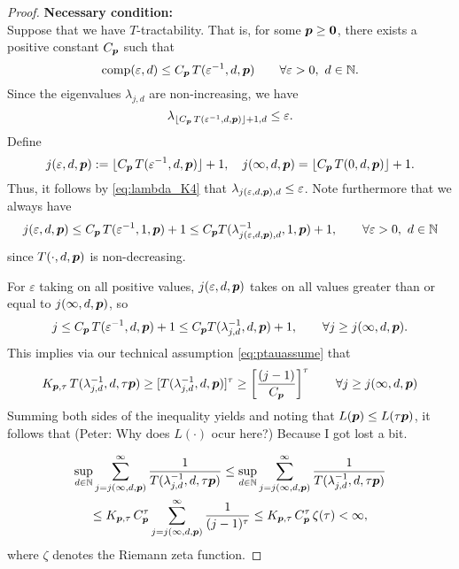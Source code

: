 \documentclass[11pt,a4paper]{article}
\newcommand{\fred}[1]{\begingroup\color{blue}#1\endgroup}
\newcommand{\peter}[1]{\begingroup\color{purple}#1\endgroup}
\begin{document}
\begin{proof}
\noindent \textbf{Necessary condition:}\\
Suppose that we have
$T$-tractability. That is, for some $\boldsymbol{p} \ge \boldsymbol{0}$, there exists a positive constant $C_{\boldsymbol{p}}$ such that
\[
\operatorname{comp}(\varepsilon,d)\le C_{\boldsymbol{p}}\, T(\varepsilon^{-1},d,\boldsymbol{p}) \qquad \forall \varepsilon > 0,  \ d \in \mathbb{N}.
\]
Since the eigenvalues $\lambda_{j,d}$ are non-increasing, we have
\begin{equation}\label{eq:lambda_K4}
	\lambda_{\lfloor C_{\boldsymbol{p}}\, T(\varepsilon^{-1},d,\boldsymbol{p})\rfloor +1,d}\le \varepsilon.
\end{equation}
Define
\[
j (\varepsilon,d,\boldsymbol{p}):= \lfloor C_{\boldsymbol{p}}\, T(\varepsilon^{-1},d,\boldsymbol{p})\rfloor +1, \quad
j (\infty,d,\boldsymbol{p}) = \lfloor C_{\boldsymbol{p}}\, T(0,d,\boldsymbol{p})\rfloor +1.
\]
Thus, it follows by \eqref{eq:lambda_K4} that $\lambda_{j(\varepsilon,d,\boldsymbol{p}),d} \le \varepsilon$.
Note furthermore that we always have
\[
j(\varepsilon,d,\boldsymbol{p})\le C_{\boldsymbol{p}}\, T(\varepsilon^{-1},1,\boldsymbol{p})+1 \le C_{\boldsymbol{p}} T(\lambda_{j(\varepsilon,d,\boldsymbol{p}),d}^{-1},1,\boldsymbol{p})+1, \qquad \forall \varepsilon > 0, \ d \in \mathbb{N}
\]
since
$T(\cdot,d,\boldsymbol{p})$ is non-decreasing.

For $\varepsilon$ taking on all positive values, $j(\varepsilon,d,\boldsymbol{p})$ takes on all values greater than or equal to $j(\infty,d,\boldsymbol{p})$, so
\[
j\le C_{\boldsymbol{p}}\, T(\varepsilon^{-1},d,\boldsymbol{p})+1 \le C_{\boldsymbol{p}} T(\lambda_{j,d}^{-1},d,\boldsymbol{p})+1, \qquad \forall j \ge j(\infty,d,\boldsymbol{p}).
\]
This implies via our technical assumption \eqref{eq:ptauassume} that
\begin{equation*}
	K_{\boldsymbol{p},\tau}\,T (\lambda_{j,d}^{-1},d,\tau \boldsymbol{p}) \ge
	[T(\lambda_{j,d}^{-1},d, \boldsymbol{p})]^\tau
	\ge
	\left[\frac{(j-1)}{C_{\boldsymbol{p}}}\right]^\tau \qquad \forall j \ge j(\infty,d,\boldsymbol{p})
\end{equation*}
Summing both sides of the inequality yields and noting that $L(\boldsymbol{p}) \le L(\tau\boldsymbol{p})$, it follows that
\peter{(Peter: Why does $L(\cdot)$ ocur here?)} \fred{Because I got lost a bit.}

\begin{multline*}
	\sup_{d\in\mathbb{N}} \sum_{j=j(\infty,d,\boldsymbol{p})}^\infty \frac{1}{T (\lambda_{j,d}^{-1},d, \tau \boldsymbol{p})} \le
	\sup_{d\in\mathbb{N}} \sum_{j=j(\infty,d,\boldsymbol{p})}^\infty \frac{1}{T (\lambda_{j,d}^{-1},d, \tau \boldsymbol{p})} \\
	\le K_{\boldsymbol{p},\tau}\, C_{\boldsymbol{p}}^\tau
	\sum_{j=j(\infty,d,\boldsymbol{p})}^\infty \frac{1}{(j-1)^\tau} \le
	K_{\boldsymbol{p},\tau}\, C_{\boldsymbol{p}}^\tau\, \zeta (\tau) < \infty,
\end{multline*}
where $\zeta$ denotes the Riemann zeta function.



\end{proof}
\end{document}
